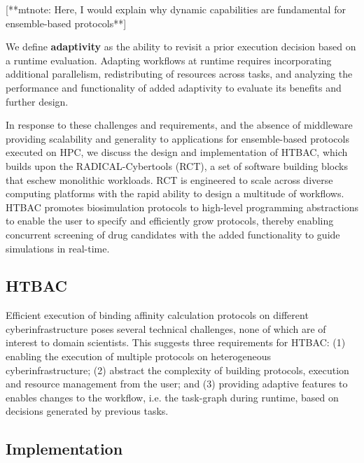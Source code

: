 [**mtnote: Here, I would explain why dynamic capabilities are fundamental for
ensemble-based protocols**]

We define \textbf{adaptivity} as the ability to revisit a prior execution
decision based on a runtime evaluation. Adapting workflows at runtime
requires incorporating additional parallelism, redistributing of resources
across tasks, and analyzing the performance and functionality of added
adaptivity to evaluate its benefits and further design.

In response to these challenges and requirements, and the absence of
middleware providing scalability and generality to applications for
ensemble-based protocols executed on HPC, we discuss the design and
implementation of HTBAC, which builds upon the RADICAL-Cybertools (RCT), a
set of software building blocks that eschew monolithic workloads. RCT is
engineered to scale across diverse computing platforms with the rapid ability
to design a multitude of workflows. HTBAC promotes biosimulation protocols to
high-level programming abstractions to enable the user to specify and
efficiently grow protocols, thereby enabling concurrent screening of drug
candidates with the added functionality to guide simulations in real-time.


\subsection{HTBAC}


Efficient execution of binding affinity calculation protocols on different
cyberinfrastructure poses several technical challenges, none of which are of
interest to domain scientists. This suggests three requirements for HTBAC\@:
(1) enabling the execution of multiple protocols on heterogeneous
cyberinfrastructure; (2) abstract the complexity of building protocols,
execution and resource management from the user; and (3) providing adaptive
features to enables changes to the workflow, i.e. the task-graph during
runtime, based on decisions generated by previous tasks.


\subsection{Implementation}

